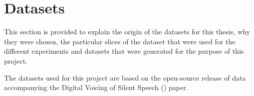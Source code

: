\chapter{Datasets} \label{chap:datasets}

This section is provided to explain the origin of the datasets for this thesis,
why they were chosen, the particular slices of the dataset that were used for
the different experiments and datasets that were generated for the purpose of
this project.

The datasets used for this project are based on the open-source release
of data accompanying the Digital Voicing of Silent Speech (\cite{gaddy2020improved})
paper.